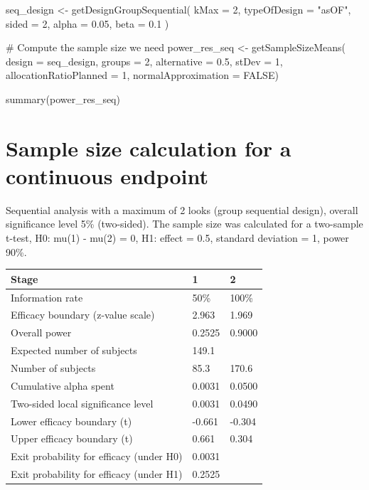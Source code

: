 \documentclass[
  letterpaper,
  DIV=11,
  numbers=noendperiod]{scrreprt}
\newenvironment{Shaded}{\begin{snugshade}}{\end{snugshade}}
\newcommand{\AttributeTok}[1]{\textcolor[rgb]{0.40,0.45,0.13}{#1}}
\newcommand{\CommentTok}[1]{\textcolor[rgb]{0.37,0.37,0.37}{#1}}
\newcommand{\ConstantTok}[1]{\textcolor[rgb]{0.56,0.35,0.01}{#1}}
\newcommand{\DecValTok}[1]{\textcolor[rgb]{0.68,0.00,0.00}{#1}}
\newcommand{\FloatTok}[1]{\textcolor[rgb]{0.68,0.00,0.00}{#1}}
\newcommand{\FunctionTok}[1]{\textcolor[rgb]{0.28,0.35,0.67}{#1}}
\newcommand{\NormalTok}[1]{\textcolor[rgb]{0.00,0.23,0.31}{#1}}
\newcommand{\OtherTok}[1]{\textcolor[rgb]{0.00,0.23,0.31}{#1}}
\newcommand{\StringTok}[1]{\textcolor[rgb]{0.13,0.47,0.30}{#1}}
\begin{document}
\begin{Shaded}
\begin{Highlighting}[]
\NormalTok{seq\_design }\OtherTok{\textless{}{-}} \FunctionTok{getDesignGroupSequential}\NormalTok{(}
  \AttributeTok{kMax =} \DecValTok{2}\NormalTok{,}
  \AttributeTok{typeOfDesign =} \StringTok{"asOF"}\NormalTok{,}
  \AttributeTok{sided =} \DecValTok{2}\NormalTok{,}
  \AttributeTok{alpha =} \FloatTok{0.05}\NormalTok{,}
  \AttributeTok{beta =} \FloatTok{0.1}
\NormalTok{  )}

\CommentTok{\# Compute the sample size we need}
\NormalTok{power\_res\_seq }\OtherTok{\textless{}{-}} \FunctionTok{getSampleSizeMeans}\NormalTok{(}
  \AttributeTok{design =}\NormalTok{ seq\_design,}
  \AttributeTok{groups =} \DecValTok{2}\NormalTok{,}
  \AttributeTok{alternative =} \FloatTok{0.5}\NormalTok{, }
  \AttributeTok{stDev =} \DecValTok{1}\NormalTok{, }
  \AttributeTok{allocationRatioPlanned =} \DecValTok{1}\NormalTok{,}
  \AttributeTok{normalApproximation =} \ConstantTok{FALSE}\NormalTok{)}

\FunctionTok{summary}\NormalTok{(power\_res\_seq)}
\end{Highlighting}
\end{Shaded}

\hypertarget{sample-size-calculation-for-a-continuous-endpoint}{%
\section{Sample size calculation for a continuous
endpoint}\label{sample-size-calculation-for-a-continuous-endpoint}}

Sequential analysis with a maximum of 2 looks (group sequential design),
overall significance level 5\% (two-sided). The sample size was
calculated for a two-sample t-test, H0: mu(1) - mu(2) = 0, H1: effect =
0.5, standard deviation = 1, power 90\%.

\begin{longtable}[]{@{}lll@{}}
\toprule\noalign{}
Stage & 1 & 2 \\
\midrule\noalign{}
\endhead
\bottomrule\noalign{}
\endlastfoot
Information rate & 50\% & 100\% \\
Efficacy boundary (z-value scale) & 2.963 & 1.969 \\
Overall power & 0.2525 & 0.9000 \\
Expected number of subjects & 149.1 & \\
Number of subjects & 85.3 & 170.6 \\
Cumulative alpha spent & 0.0031 & 0.0500 \\
Two-sided local significance level & 0.0031 & 0.0490 \\
Lower efficacy boundary (t) & -0.661 & -0.304 \\
Upper efficacy boundary (t) & 0.661 & 0.304 \\
Exit probability for efficacy (under H0) & 0.0031 & \\
Exit probability for efficacy (under H1) & 0.2525 & \\
\end{longtable}
\end{document}
